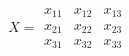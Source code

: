     \begin{center}
        \begin{equation*}
            X =
            \begin{matrix}
                x_{11} & x_{12} & x_{13} \\
                x_{21} & x_{22} & x_{23} \\
                x_{31} & x_{32} & x_{33}
            \end{matrix}
        \end{equation*}
    \end{center}
